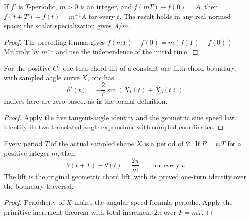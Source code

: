 \begin{lemma}
\label{lem:periodic-primitive-multiplicity}
\leanok
{}
If $f'$ is $T$-periodic, $m>0$ is an integer, and $f(mT)-f(0)=A$,
then $f(t+T)-f(t)=m^{-1}A$ for every $t$. The result holds in any
real normed space; the scalar specialization gives $A/m$.
\end{lemma}
\begin{proof}
\leanok
The preceding lemma gives $f(mT)-f(0)=m(f(T)-f(0))$.
Multiply by $m^{-1}$ and use the independence of the initial time.
\end{proof}

\begin{lemma}
\label{lem:pentagon-angular-speed}
\leanok
{}
For the positive $C^1$ one-turn chord lift of a constant one-fifth chord
boundary, with sampled angle curve $X$, one has
\[
 \theta'(t)=-\frac{2}{\ell}\sin(X_1(t)+X_3(t)).
\]
Indices here are zero based, as in the formal definition.
\end{lemma}
\begin{proof}
\leanok
Apply the five tangent-angle identity and the geometric sine speed law.
Identify its two translated angle expressions with sampled coordinates.
\end{proof}

\begin{proposition}
\label{prop:pentagon-shape-turning}
\leanok
{}
Every period $T$ of the actual sampled shape $X$ is a period of
$\theta'$. If $P=mT$ for a positive integer $m$, then
\[
 \theta(t+T)-\theta(t)=\frac{2\pi}{m}\qquad\text{for every }t.
\]
The lift is the original geometric chord lift, with its proved one-turn
identity over the boundary traversal.
\end{proposition}
\begin{proof}
\leanok
Periodicity of $X$ makes the angular-speed formula periodic. Apply the
primitive increment theorem with total increment $2\pi$ over $P=mT$.
\end{proof}

